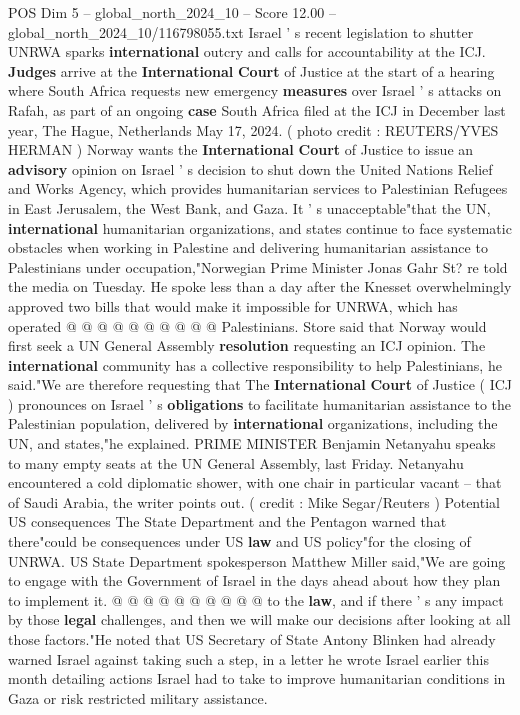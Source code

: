 \begin{textsample}{POS Dim 5 – global\_north\_2024\_10 – Score 12.00 – global\_north\_2024\_10/116798055.txt}  \label{ex:f5_pos_406}
Israel ' s recent legislation to shutter UNRWA sparks \textbf{international} outcry and calls for accountability at the ICJ. \textbf{Judges} arrive at the \textbf{International} \textbf{Court} of Justice at the start of a hearing where South Africa requests new emergency \textbf{measures} over Israel ' s attacks on Rafah, as part of an ongoing \textbf{case} South Africa filed at the ICJ in December last year, The Hague, Netherlands May 17, 2024. ( photo credit : REUTERS/YVES HERMAN ) Norway wants the \textbf{International} \textbf{Court} of Justice to issue an \textbf{advisory} opinion on Israel ' s decision to shut down the United Nations Relief and Works Agency, which provides humanitarian services to Palestinian Refugees in East Jerusalem, the West Bank, and Gaza.
It ' s unacceptable"that the UN, \textbf{international} humanitarian organizations, and states continue to face systematic obstacles when working in Palestine and delivering humanitarian assistance to Palestinians under occupation,"Norwegian Prime Minister Jonas Gahr St? re told the media on Tuesday.
He spoke less than a day after the Knesset overwhelmingly approved two bills that would make it impossible for UNRWA, which has operated @ @ @ @ @ @ @ @ @ @ Palestinians.
Store said that Norway would first seek a UN General Assembly \textbf{resolution} requesting an ICJ opinion.
The \textbf{international} community has a collective responsibility to help Palestinians, he said."We are therefore requesting that The \textbf{International} \textbf{Court} of Justice ( ICJ ) pronounces on Israel ' s \textbf{obligations} to facilitate humanitarian assistance to the Palestinian population, delivered by \textbf{international} organizations, including the UN, and states,"he explained.
PRIME MINISTER Benjamin Netanyahu speaks to many empty seats at the UN General Assembly, last Friday.
Netanyahu encountered a cold diplomatic shower, with one chair in particular vacant -- that of Saudi Arabia, the writer points out. ( credit : Mike Segar/Reuters ) Potential US consequences The State Department and the Pentagon warned that there"could be consequences under US \textbf{law} and US policy"for the closing of UNRWA.
US State Department spokesperson Matthew Miller said,"We are going to engage with the Government of Israel in the days ahead about how they plan to implement it. @ @ @ @ @ @ @ @ @ @ to the \textbf{law}, and if there ' s any impact by those \textbf{legal} challenges, and then we will make our decisions after looking at all those factors."He noted that US Secretary of State Antony Blinken had already warned Israel against taking such a step, in a letter he wrote Israel earlier this month detailing actions Israel had to take to improve humanitarian conditions in Gaza or risk restricted military assistance.

\end{textsample}
